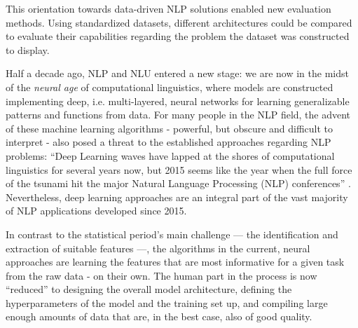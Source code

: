 
This orientation towards data-driven NLP solutions enabled new evaluation methods.
Using standardized datasets, different architectures could be compared to evaluate
their capabilities regarding the problem the dataset was constructed to display.

Half a decade ago, NLP and NLU entered a new stage: we are
now in the midst of the \emph{neural age} of computational
linguistics, where models are constructed implementing
deep, i.e. multi-layered, neural networks for learning
generalizable patterns and functions from data. For many
people in the NLP field, the advent of these machine learning
algorithms - powerful, but obscure and difficult to interpret
- also posed a threat to the established approaches regarding
NLP problems: ``Deep Learning waves have lapped at the shores
of computational linguistics for several years now, but 2015
seems like the year when the full force of the tsunami hit
the major Natural Language Processing (NLP) conferences''
\citep[p.~701]{manning2015computational}. Nevertheless, deep
learning approaches are an integral part of the vast majority
of NLP applications developed since 2015.

In contrast to the statistical period's main challenge --- the identification
and extraction of suitable features ---, the algorithms in the current, neural
approaches are learning the features that are most informative for a given task
from the raw data - on their own. The human part in the
process is now ``reduced'' to designing the overall model architecture, defining the
hyperparameters of the model and the training set up, and compiling large enough
amounts of data that are, in the best case, also of good quality.

